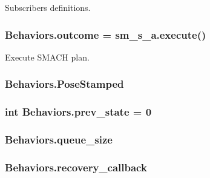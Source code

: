 Subscribers definitions. 

\subsubsection[{\texorpdfstring{outcome}{outcome}}]{\setlength{\rightskip}{0pt plus 5cm}Behaviors.\+outcome = sm\+\_\+s\+\_\+a.\+execute()}\hypertarget{namespaceBehaviors_ae349e339b61a19499bcd34baefbd77ba}{}\label{namespaceBehaviors_ae349e339b61a19499bcd34baefbd77ba}


Execute S\+M\+A\+CH plan. 

\subsubsection[{\texorpdfstring{Pose\+Stamped}{PoseStamped}}]{\setlength{\rightskip}{0pt plus 5cm}Behaviors.\+Pose\+Stamped}\hypertarget{namespaceBehaviors_a46e25ae172a62cf80114356ad513b371}{}\label{namespaceBehaviors_a46e25ae172a62cf80114356ad513b371}
\subsubsection[{\texorpdfstring{prev\+\_\+state}{prev_state}}]{\setlength{\rightskip}{0pt plus 5cm}int Behaviors.\+prev\+\_\+state = 0}\hypertarget{namespaceBehaviors_a2de241e90497b66cefc28211136d938b}{}\label{namespaceBehaviors_a2de241e90497b66cefc28211136d938b}
\subsubsection[{\texorpdfstring{queue\+\_\+size}{queue_size}}]{\setlength{\rightskip}{0pt plus 5cm}Behaviors.\+queue\+\_\+size}\hypertarget{namespaceBehaviors_a182345f6e56bfb62f2fe95e488624da4}{}\label{namespaceBehaviors_a182345f6e56bfb62f2fe95e488624da4}
\subsubsection[{\texorpdfstring{recovery\+\_\+callback}{recovery_callback}}]{\setlength{\rightskip}{0pt plus 5cm}Behaviors.\+recovery\+\_\+callback}\hypertarget{namespaceBehaviors_a58f5bdd371d18a7f2a82d97b0db5a536}{}\label{namespaceBehaviors_a58f5bdd371d18a7f2a82d97b0db5a536}
